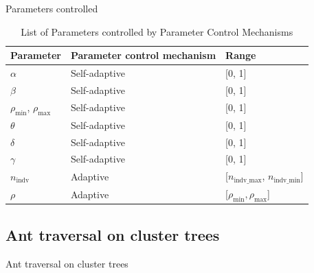 \documentclass[aspectratio=169]{beamer}
\begin{document}
\begin{frame}{Parameters controlled}
    \begin{table}
        \small
        \caption{List of Parameters controlled by Parameter Control Mechanisms}
        \label{tab:control_param}
        \begin{tabular}{l|l|l}
            \hline
            Parameter                                & Parameter control mechanism & Range                                            \\
            \hline
            $\alpha$                                 & Self-adaptive               & [0, 1]                                           \\
            $\beta$                                  & Self-adaptive               & [0, 1]                                           \\
            $\rho_{\text{min}}$, $\rho_{\text{max}}$ & Self-adaptive               & [0, 1]                                           \\
            $\theta$                                 & Self-adaptive               & [0, 1]                                           \\
            $\delta$                                 & Self-adaptive               & [0, 1]                                           \\
            $\gamma$                                 & Self-adaptive               & [0, 1]                                           \\
            $n_{\text{indv}}$                        & Adaptive                    & [$n_{\text{indv\_max}}$, $n_{\text{indv\_min}}$] \\
            $\rho$                                   & Adaptive                    & [$\rho_{\text{min}}, \rho_\text{{max}}$]         \\
            \hline
        \end{tabular}
    \end{table}
\end{frame}


\subsection{Ant traversal on cluster trees}
\begin{frame}{Ant traversal on cluster trees}
    \vspace{0.1cm}
    \centering
    
\end{frame}
\end{document}
